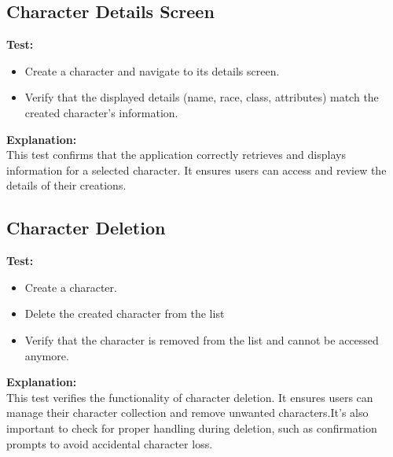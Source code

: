 \documentclass{article}
\begin{document}
    \subsection{Character Details Screen}
        \textbf {Test:}
        \begin{itemize}
            \item Create a character and navigate to its details screen.
            \item Verify that the displayed details (name, race, class, attributes) match the created character's information.
        \end{itemize}
        
        \textbf {Explanation:}\\
         This test confirms that the application correctly retrieves and displays information for a selected character. It ensures users can access and review the details of their creations.

    
    \subsection{Character Deletion} 
    
        \textbf{Test:} 
        \begin{itemize}
            \item Create a character.
            \item Delete the created character from the list
            \item Verify that the character is removed from the list and cannot be accessed anymore.
        \end{itemize}
        
        \textbf{Explanation:}\\ 
        This test verifies the functionality of character deletion. It ensures users can manage their character collection and remove unwanted characters.It's also important to check for proper handling during deletion, such as confirmation prompts to avoid accidental character loss.
        
\newpage
\end{document}
